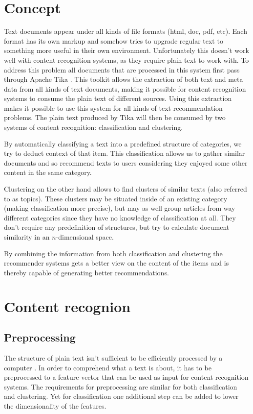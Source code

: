 \documentclass[twocolumn,twoside,a4paper]{phdsymp} %
\begin{document}
\section{Concept}
Text documents appear under all kinds of file formats (html, doc, pdf, etc). Each format has its own markup and somehow tries to upgrade regular text to something more useful in their own environment. Unfortunately this doesn't work well with content recognition systems, as they require plain text to work with. To address this problem all documents that are processed in this system first pass through Apache Tika \cite{tika}. This toolkit allows the extraction of both text and meta data from all kinds of text documents, making it possible for content recognition systems to consume the plain text of different sources. Using this extraction makes it possible to use this system for all kinds of text recommendation problems. The plain text produced by Tika will then be consumed by two systems of content recognition: classification and clustering.

By automatically classifying a text into a predefined structure of categories, we try to deduct context of that item. This classification allows us to gather similar documents and so recommend texts to users considering they enjoyed some other content in the same category.

Clustering on the other hand allows to find clusters of similar texts (also referred to as topics). These clusters may be situated inside of an existing category (making classification more precise), but may as well group articles from way different categories since they have no knowledge of classification at all. They don't require any predefinition of structures, but try to calculate document similarity in an $n$-dimensional space.

By combining the information from both classification and clustering the recommender systems gets a better view on the content of the items and is thereby capable of generating better recommendations.

\section{Content recognion}
\subsection{Preprocessing}
The structure of plain text isn't sufficient to be efficiently processed by a computer \cite{Hotho2005}. In order to comprehend what a text is about, it has to be preprocessed to a feature vector that can be used as input for content recognition systems. The requirements for preprocessing are similar for both classification and clustering. Yet for classification one additional step can be added to lower the dimensionality of the features.
\end{document}
